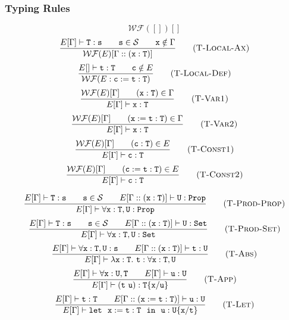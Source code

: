 \subsubsection{Typing Rules}
\begin{equation*}
\mathcal{WF}([])[] 
    \tag{\sc T-Empty}
\end{equation*}
\begin{equation*}
\frac{E[\Gamma]\vdash {\tt T:s\qquad s\in\mathcal{S}\qquad x}\notin\Gamma}
    {\mathcal{WF}(E)[\Gamma ::(\tt x:T)]} 
    \tag{\sc T-Local-Ax}
\end{equation*}
\begin{equation*}
\frac{E[]\vdash {\tt t:T\qquad c}\notin E}
    {\mathcal{WF}(E:\tt c:=t:T)} 
    \tag{\sc T-Local-Def}
\end{equation*}
\begin{equation*}
\frac{\mathcal{WF}(E)[\Gamma]\qquad ({\tt x:T})\in\Gamma}
    {E[\Gamma]\vdash\tt x:T} 
    \tag{\sc T-Var1}
\end{equation*}
\begin{equation*}
\frac{\mathcal{WF}(E)[\Gamma]\qquad ({\tt x:=t:T})\in\Gamma}
    {E[\Gamma]\vdash\tt x:T} 
    \tag{\sc T-Var2}
\end{equation*}
\begin{equation*}
\frac{\mathcal{WF}(E)[\Gamma]\qquad ({\tt c:T})\in E}
    {E[\Gamma]\vdash\tt c:T} 
    \tag{\sc T-Const1}
\end{equation*}
\begin{equation*}
\frac{\mathcal{WF}(E)[\Gamma]\qquad ({\tt c:=t:T})\in E}
    {E[\Gamma]\vdash\tt c:T} 
    \tag{\sc T-Const2}
\end{equation*}

\begin{equation*}
\frac{E[\Gamma]\vdash{\tt T:s\qquad s\in\mathcal{S}}\qquad E[\Gamma::({\tt x:T})]\vdash\tt U:Prop}
    {E[\Gamma]\vdash\tt\forall x:T,U:Prop} 
    \tag{\sc T-Prod-Prop}
\end{equation*}
\begin{equation*}
\frac{E[\Gamma]\vdash{\tt T:s\qquad s\in\mathcal{S}}\qquad E[\Gamma::({\tt x:T})]\vdash\tt U:Set}
    {E[\Gamma]\vdash\tt\forall x:T,U:Set} 
    \tag{\sc T-Prod-Set}
\end{equation*}
\begin{equation*}
\frac{E[\Gamma]\vdash\forall{\tt x:T,U:s}\qquad E[\Gamma::({\tt x:T})]\vdash{\tt t:U}}
    {E[\Gamma]\vdash\lambda{\tt x:T.\ t:\forall x:T,U}} 
    \tag{\sc T-Abs}
\end{equation*}
\begin{equation*}
\frac{E[\Gamma]\vdash\forall{\tt x:U,T}\qquad E[\Gamma]\vdash{\tt u:U}}
    {E[\Gamma]\vdash{\tt (t\ u):T\{x/u\}}} 
    \tag{\sc T-App}
\end{equation*}
\begin{equation*}
\frac{E[\Gamma]\vdash{\tt t:T}\qquad E[\Gamma::({\tt x:=t:T})]\vdash{\tt u:U}}
    {E[\Gamma]\vdash{\tt let\ \ x:=t:T\ \ in\ \ u:U\{x/t\}}} 
    \tag{\sc T-Let}
\end{equation*}

